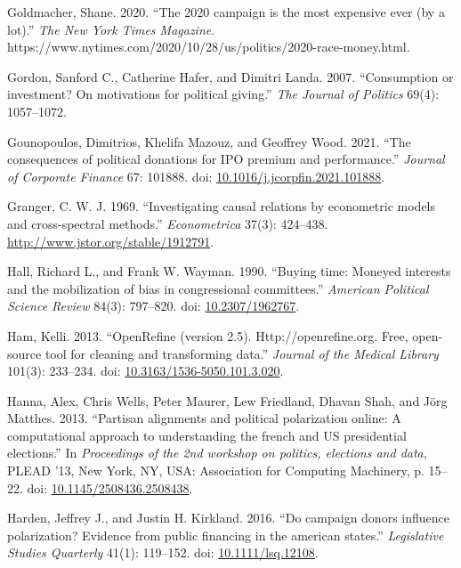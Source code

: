 \documentclass[12pt,]{article}
\newlength{\cslhangindent}
\newenvironment{CSLReferences}%
    {\setlength{\parindent}{0pt}%
    \everypar{\setlength{\hangindent}{\cslhangindent}}\ignorespaces}%
    {\par}
\begin{document}
\begin{CSLReferences}{1}{0}
\leavevmode{}%
Goldmacher, Shane. 2020. {``The 2020 campaign is the most expensive ever
(by a lot).''} \emph{The New York Times Magazine}.
https://www.nytimes.com/2020/10/28/us/politics/2020-race-money.html.

\leavevmode{}%
Gordon, Sanford C., Catherine Hafer, and Dimitri Landa. 2007.
{``Consumption or investment? On motivations for political giving.''}
\emph{The Journal of Politics} 69(4): 1057--1072.

\leavevmode{}%
Gounopoulos, Dimitrios, Khelifa Mazouz, and Geoffrey Wood. 2021. {``The
consequences of political donations for IPO premium and performance.''}
\emph{Journal of Corporate Finance} 67: 101888. doi:
\href{https://doi.org/10.1016/j.jcorpfin.2021.101888}{10.1016/j.jcorpfin.2021.101888}.

\leavevmode{}%
Granger, C. W. J. 1969. {``Investigating causal relations by econometric
models and cross-spectral methods.''} \emph{Econometrica} 37(3):
424--438. \url{http://www.jstor.org/stable/1912791}.

\leavevmode{}%
Hall, Richard L., and Frank W. Wayman. 1990. {``Buying time: Moneyed
interests and the mobilization of bias in congressional committees.''}
\emph{American Political Science Review} 84(3): 797--820. doi:
\href{https://doi.org/10.2307/1962767}{10.2307/1962767}.

\leavevmode{}%
Ham, Kelli. 2013. {``OpenRefine (version 2.5). Http://openrefine.org.
Free, open-source tool for cleaning and transforming data.''}
\emph{Journal of the Medical Library} 101(3): 233--234. doi:
\href{https://doi.org/10.3163/1536-5050.101.3.020}{10.3163/1536-5050.101.3.020}.

\leavevmode{}%
Hanna, Alex, Chris Wells, Peter Maurer, Lew Friedland, Dhavan Shah, and
Jörg Matthes. 2013. {``Partisan alignments and political polarization
online: A computational approach to understanding the french and US
presidential elections.''} In \emph{Proceedings of the 2nd workshop on
politics, elections and data}, PLEAD '13, New York, NY, USA: Association
for Computing Machinery, p. 15--22. doi:
\href{https://doi.org/10.1145/2508436.2508438}{10.1145/2508436.2508438}.

\leavevmode{}%
Harden, Jeffrey J., and Justin H. Kirkland. 2016. {``Do campaign donors
influence polarization? Evidence from public financing in the american
states.''} \emph{Legislative Studies Quarterly} 41(1): 119--152. doi:
\href{https://doi.org/10.1111/lsq.12108}{10.1111/lsq.12108}.


\end{CSLReferences}
\end{document}
